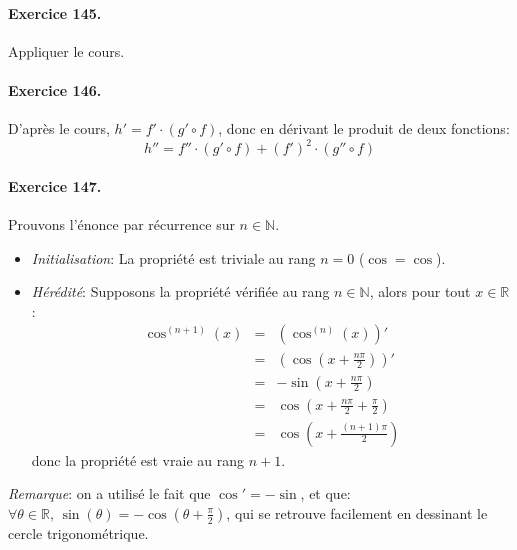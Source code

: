 \paragraph{Exercice 145.} Appliquer le cours.

\paragraph{Exercice 146.} D’après le cours, $h'=f' \cdot (g' \circ f)$, donc en dérivant le produit de deux fonctions:
\[
h''=f''\cdot (g' \circ f) + (f')^2 \cdot (g'' \circ f) 
\]

\paragraph{Exercice 147.} Prouvons l’énonce par récurrence sur $n\in\mathbb{N}$.
\begin{itemize} 
\item \textit{Initialisation}: La propriété est triviale au rang $n=0$ ($\cos=\cos$).\\
\item \textit{Hérédité}: Supposons la propriété vérifiée au rang $n\in\mathbb{N}$, alors pour tout $ x \in \mathbb{R}$:
\begin{eqnarray}
 \cos^{(n+1)}(x) &=& \left(\cos^{(n)}(x)\right)' \nonumber \\
  &=&  \left(\cos \left( x+\frac{n\pi}{2} \right) \right)' \nonumber \\
  &=&  -\sin \left( x+\frac{n\pi}{2} \right) \nonumber \\
  &=&  \cos \left( x+\frac{n\pi}{2} +\frac{\pi}{2}\right) \nonumber \\
  &=&  \cos \left( x+\frac{(n+1)\pi}{2}\right) \nonumber 
\end{eqnarray}
donc la propriété est vraie au rang $n+1$.
\end{itemize}
\textit{Remarque}: on a utilisé le fait que $\cos'=-\sin$, et que: $\forall \theta\in\mathbb{R}, \, \sin(\theta)=-\cos \left(\theta+\frac{\pi}{2}\right)$, qui se retrouve facilement en dessinant le cercle trigonométrique.

